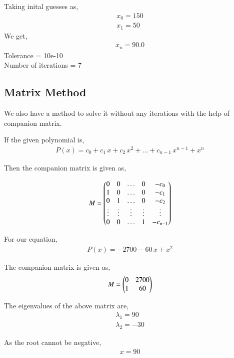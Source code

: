 \documentclass[journal]{IEEEtran}
\begin{document}
    Taking inital guesses as,
    \begin{align}
        x_0 = 150\\
        x_1 = 50
    \end{align}
    We get,
    \begin{align}
        x_n = 90.0
    \end{align}
    Tolerance = 10e-10\\
    Number of iterations = 7

\subsection{Matrix Method}
We also have a method to solve it without any iterations with the help of companion matrix.

If the given polynomial is,
\begin{align}
	P(x) = c_0 + c_1\,x + c_2\,x^2 + \dots + c_{n-1}\,x^{n-1} + x^n
\end{align}

Then the companion matrix is given as,

\begin{align}
	M = \begin{pmatrix}0 & 0 & \dots & 0 & -c_0\\1 & 0 & \dots & 0 & -c_1\\0 & 1 & \dots & 0 & -c_2\\\vdots & \vdots & \vdots & \vdots &\vdots \\0 & 0 & \dots & 1 & -c_{n-1}\end{pmatrix}
\end{align}

For our equation,
\begin{align}
    P(x) = -2700 - 60\,x + x^2
\end{align}

The companion matrix is given as,
\begin{align}
    M = \begin{pmatrix}0 & 2700\\1 & 60\end{pmatrix}
\end{align}

The eigenvalues of the above matrix are,
\begin{align}
    \lambda_1 = 90\\
    \lambda_2 = -30
\end{align}

As the root cannot be negative,
\begin{align}
    x = 90
\end{align}
\end{document}
